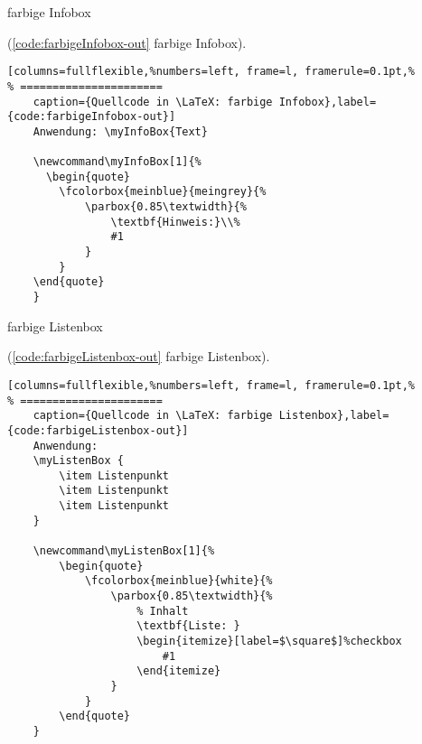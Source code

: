 farbige Infobox

(\autoref{code:farbigeInfobox-out} farbige Infobox).
\lstset{language=[LaTeX]TeX} %
\begin{lstlisting}[columns=fullflexible,%numbers=left, frame=l, framerule=0.1pt,%
% ======================
	caption={Quellcode in \LaTeX: farbige Infobox},label={code:farbigeInfobox-out}]
	Anwendung: \myInfoBox{Text}

	\newcommand\myInfoBox[1]{%
	  \begin{quote}
		\fcolorbox{meinblue}{meingrey}{%
			\parbox{0.85\textwidth}{%
				\textbf{Hinweis:}\\%
				#1
			}
		}
	\end{quote}
	}
\end{lstlisting}

farbige Listenbox

(\autoref{code:farbigeListenbox-out} farbige Listenbox).
\lstset{language=[LaTeX]TeX} %
\begin{lstlisting}[columns=fullflexible,%numbers=left, frame=l, framerule=0.1pt,%
% ======================
	caption={Quellcode in \LaTeX: farbige Listenbox},label={code:farbigeListenbox-out}]
	Anwendung:
	\myListenBox {
		\item Listenpunkt
		\item Listenpunkt
		\item Listenpunkt
	}

	\newcommand\myListenBox[1]{%
		\begin{quote}
			\fcolorbox{meinblue}{white}{%
				\parbox{0.85\textwidth}{%
					% Inhalt
					\textbf{Liste: }
					\begin{itemize}[label=$\square$]%checkbox
						#1
					\end{itemize}
				}
			}
		\end{quote}
	}
\end{lstlisting}

